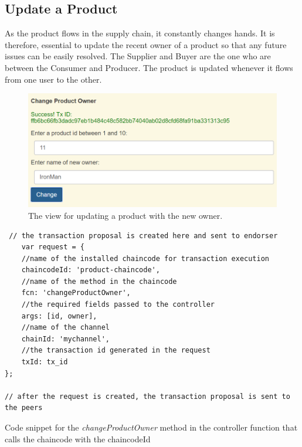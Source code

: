 \documentclass[
  a4paper,  %
  twoside,  %
  bibliography=totoc,
  headsepline,
  cleardoublepage=empty,
  parskip=half,
  draft=false
]{scrbook}
\begin{document}
\subsection{Update a Product}
As the product flows in the supply chain, it constantly changes hands. It is therefore, essential to update the recent owner of a product so that any future issues can be easily resolved. The Supplier and Buyer are the one who are between the Consumer and Producer. The product is updated whenever it flows from one user to the other.
\begin{figure}[h!]
\begin{center}
\includegraphics[width=\textwidth]{graphics/updateProductSuccess.png}
\caption{The view for updating a product with the new owner.}
\label{fig:up}
\end{center}
\end{figure}
\begin{Listing}[h!]
\begin{lstlisting}
 // the transaction proposal is created here and sent to endorser
    var request = {
    //name of the installed chaincode for transaction execution
    chaincodeId: 'product-chaincode',
    //name of the method in the chaincode
    fcn: 'changeProductOwner',
    //the required fields passed to the controller
    args: [id, owner],
    //name of the channel
    chainId: 'mychannel',
    //the transaction id generated in the request
    txId: tx_id
};

// after the request is created, the transaction proposal is sent to the peers
\end{lstlisting}
\caption{Code snippet for the \textit{changeProductOwner} method in the controller function that calls the chaincode with the chaincodeId}
\label{lst:upr}
\end{Listing}
\end{document}
